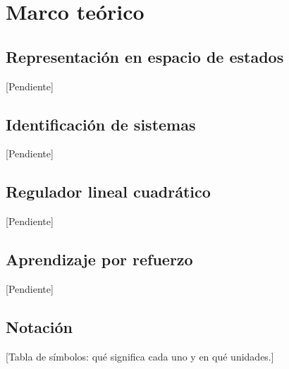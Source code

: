 \chapter{Marco teórico}
\label{cap:marco_teorico}


\section{Representación en espacio de estados}
[Pendiente]

\section{Identificación de sistemas}
[Pendiente]

\section{Regulador lineal cuadrático}
[Pendiente]

\section{Aprendizaje por refuerzo}
[Pendiente]

\section{Notación}
[Tabla de símbolos: qué significa cada uno y en qué unidades.]
